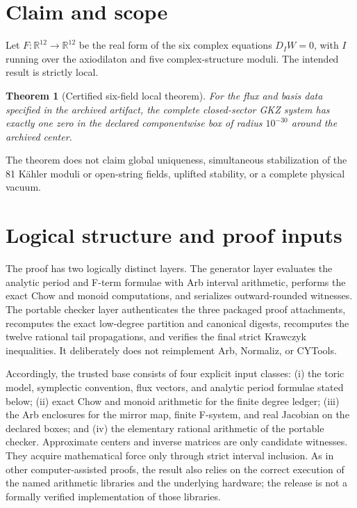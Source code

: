 \documentclass[11pt]{article}
\newtheorem{theorem}{Theorem}
\begin{document}
\section{Claim and scope}

Let $F:\mathbb R^{12}\rightarrow\mathbb R^{12}$ be the real form of the six
complex equations $D_IW=0$, with $I$ running over the axiodilaton and five
complex-structure moduli.  The intended result is strictly local.

\begin{theorem}[Certified six-field local theorem]\label{thm:target}
For the flux and basis data specified in the archived artifact, the complete
closed-sector GKZ system has exactly one zero in the declared componentwise
box of radius $10^{-30}$ around the archived center.
\end{theorem}

The theorem does not claim global uniqueness, simultaneous stabilization of
the 81 K\"ahler moduli or open-string fields, uplifted stability, or a complete
physical vacuum.



\section{Logical structure and proof inputs}

The proof has two logically distinct layers.  The generator layer evaluates
the analytic period and F-term formulae with Arb interval arithmetic, performs
the exact Chow and monoid computations, and serializes outward-rounded
witnesses.  The portable checker layer authenticates the three packaged proof
attachments, recomputes the exact low-degree partition and canonical digests,
recomputes the twelve rational tail propagations, and verifies the final
strict Krawczyk inequalities.  It deliberately does not reimplement Arb,
Normaliz, or CYTools.

Accordingly, the trusted base consists of four explicit input classes:
(i) the toric model, symplectic convention, flux vectors, and analytic period
formulae stated below; (ii) exact Chow and monoid arithmetic for the finite
degree ledger; (iii) the Arb enclosures for the mirror map, finite F-system,
and real Jacobian on the declared boxes; and (iv) the elementary rational
arithmetic of the portable checker.  Approximate centers and inverse matrices
are only candidate witnesses.  They acquire mathematical force only through
strict interval inclusion.  As in other computer-assisted proofs, the result
also relies on the correct execution of the named arithmetic libraries and
the underlying hardware; the release is not a formally verified
implementation of those libraries.
\end{document}
